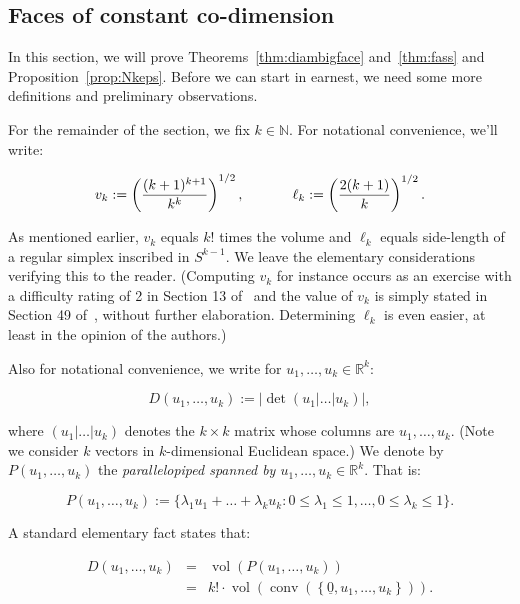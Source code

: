 \documentclass[11pt]{article}%
\newcommand{\eR}[0]{\ensuremath{ \mathbb R}}
\newcommand{\eN}[0]{\ensuremath{ \mathbb N}}
\newcommand{\orig}{\underline{0}}
\DeclareMathOperator{\conv}{conv}
\DeclareMathOperator{\vol}{vol}
\begin{document}
\subsection{Faces of constant co-dimension\label{sec:regsimpl}}



In this section, we will prove Theorems~\ref{thm:diambigface} and~\ref{thm:fass} and Proposition~\ref{prop:Nkeps}.
Before we can start in earnest, we need some more definitions and 
preliminary observations.

For the remainder of the section, we fix $k \in \eN$.
For notational convenience, we'll write:

$$ v_k := \left(\frac{(k+1)^{k+1}}{k^{k}}\right)^{1/2}, \hspace{8ex} \ell_k := \left(\frac{2(k+1)}{k}\right)^{1/2}. $$

\noindent
As mentioned earlier, $v_k$ equals $k!$ times the volume and $\ell_k$ equals side-length of 
a regular simplex inscribed in $S^{k-1}$.
We leave the elementary considerations verifying this to the reader.  
(Computing $v_k$ for instance occurs as an exercise with a difficulty rating of 2
in Section 13 of~\cite{MatousekDiscrGeom} and 
the value of $v_k$ is simply stated in Section 49 of~\cite{FejestothRegFig}, without further elaboration.
Determining $\ell_k$ is even easier, at least in the opinion of the 
authors.)

Also for notational convenience, we write for $u_1,\dots,u_k \in\eR^k$:

\begin{equation}\label{eq:Ddef} 
D(u_1,\dots,u_k) := \left|\det\left(u_1|\ldots|u_k\right)\right|, 
\end{equation}

\noindent
where $(u_1|\ldots|u_k)$ denotes the $k\times k$ matrix whose columns are $u_1,\dots,u_k$.
(Note we consider $k$ vectors in $k$-dimensional Euclidean space.)
We denote by $P(u_1,\dots,u_k)$ the {\em parallelopiped spanned by $u_1,\dots,u_k \in \eR^k$}. That is:

$$ P(u_1,\dots,u_k) := \{ \lambda_1 u_1 + \dots + \lambda_k u_k : 0 \leq \lambda_1 \leq 1, \dots, 0\leq \lambda_k \leq 1 \}. $$

\noindent
A standard elementary fact states that:

\begin{equation}\label{eq:elem} \begin{array}{rcl} 
D(u_1,\dots,u_k)
& = & \vol( P(u_1,\dots,u_k) ) \\
& = & k! \cdot \vol\left( \conv\left(\left\{\orig,u_1,\dots,u_k\right\}\right)\right). 
  \end{array} \end{equation}
\end{document}
